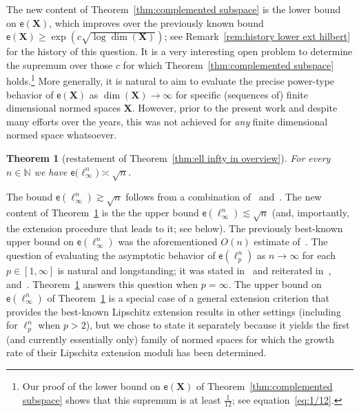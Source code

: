 \documentclass[11pt,reqno]{amsart}
\renewcommand{\ge}{\geqslant}
\newcommand{\X}{\mathbf X}
\newtheorem{theorem}{Theorem}
\theoremstyle{remark}
\newcommand{\N}{\mathbb N}
\newcommand{\ee}{\mathsf{e}}
\renewcommand{\1}{\mathbf 1}
\begin{document}
The new content of Theorem~\ref{thm:complemented subspace} is the lower bound on $\ee(\X)$, which improves over the previously known bound $\ee(\X)\ge \exp(c\sqrt{\log \dim(\X)})$; see Remark~\ref{rem:history lower ext hilbert} for the history of this question. It is a very interesting open problem to determine the supremum over those  $c$ for which Theorem~\ref{thm:complemented subspace} holds.\footnote{Our proof of the lower bound on $\ee(\X)$ of Theorem~\ref{thm:complemented subspace} shows that this supremum is at least $\frac{1}{12}$; see equation~\eqref{eq:1/12}.} More generally, it is natural to aim to evaluate the precise power-type behavior of $\ee(\X)$ as $\dim(\X)\to \infty$ for specific (sequences of) finite dimensional normed spaces $\X$. However, prior to the present work and despite many efforts over the years, this was not achieved for {\em any} finite dimensional normed space whatsoever.
\begin{theorem}[restatement of Theorem~\ref{thm:ell infty in overview}]\label{thm:ell infty}
For every $n\in \N$ we have $\ee\big(\ell_\infty^n\big)\asymp\sqrt{n}$.
\end{theorem}


The bound $\ee(\ell_\infty^n)\gtrsim \sqrt{n}$ follows from  a  combination of~\cite[Theorem~4]{BB05} and~\cite[Theorem~1.2]{BB07-2}.  The new content of Theorem~\ref{thm:ell infty} is the the upper bound  $\ee(\ell_\infty^n)\lesssim \sqrt{n}$ (and, importantly, the extension procedure that leads to it; see below). The previously best-known upper bound on $\ee(\ell_\infty^n)$ was the aforementioned $O(n)$ estimate of~\cite{JLS86}.  The question of evaluating the asymptotic behavior of $\ee(\ell_p^n)$ as $n\to\infty$ for each $p\in [1,\infty]$ is natural and longstanding;  it was stated  in~\cite[Problem~2]{BB05} and reiterated in~\cite[Section~4]{BB07}, \cite[Problem~1.4]{BB07-2} and~\cite[Problem~8.14]{BB12}. Theorem~\ref{thm:ell infty} answers this question when $p=\infty$. The upper bound on $\ee(\ell_\infty^n)$ of Theorem~\ref{thm:ell infty} is a special case of a general extension criterion that provides the best-known Lipschitz extension results in other settings (including for $\ell_p^n$ when $p>2$), but we chose to state it separately because it yields the first (and currently essentially only) family of normed spaces for which the growth rate  of their Lipschitz extension moduli has been determined.
\end{document}
